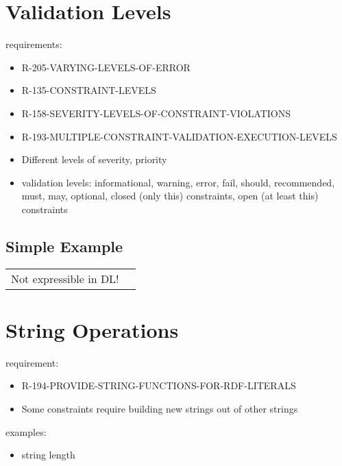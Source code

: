 \documentclass{llncs}
\newenvironment{DL}{
  \vspace{0cm}
	\begin{center}
  \begin{tabular}{r l}

}{
  \end{tabular}
	\end{center}
}
\begin{document}
\section{Validation Levels}

requirements:

\begin{itemize}
	\item R-205-VARYING-LEVELS-OF-ERROR
	\item R-135-CONSTRAINT-LEVELS
	\item R-158-SEVERITY-LEVELS-OF-CONSTRAINT-VIOLATIONS
	\item R-193-MULTIPLE-CONSTRAINT-VALIDATION-EXECUTION-LEVELS
\end{itemize}

\begin{itemize}
  \item Different levels of severity, priority
	\item validation levels: informational, warning, error, fail, should, recommended, must, may, optional, closed (only this) constraints, open (at least this) constraints
\end{itemize}

\subsection{Simple Example}

\begin{DL}
Not expressible in DL!
\end{DL}

\section{String Operations}

requirement:

\begin{itemize}
	\item R-194-PROVIDE-STRING-FUNCTIONS-FOR-RDF-LITERALS
\end{itemize}

\begin{itemize}
	\item Some constraints require building new strings out of other strings
\end{itemize}

examples:

\begin{itemize}
	\item string length
\end{itemize}
\end{document}
